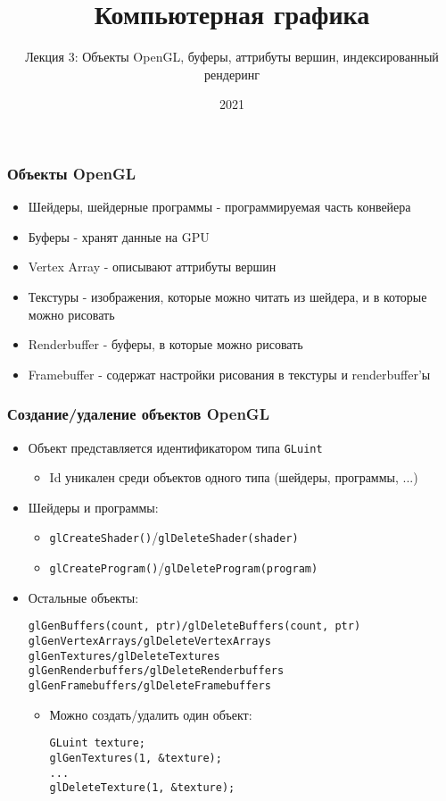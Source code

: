 \documentclass{beamer}
\title{Компьютерная графика}
\subtitle{Лекция 3: Объекты OpenGL, буферы, аттрибуты вершин, индексированный рендеринг}
\date{2021}
\begin{document}
\frame{\titlepage}

\begin{frame}[fragile]
\frametitle{Объекты OpenGL}
\begin{itemize}
\item Шейдеры, шейдерные программы - программируемая часть конвейера
\pause
\item Буферы - хранят данные на GPU
\pause
\item Vertex Array - описывают аттрибуты вершин
\pause
\item Текстуры - изображения, которые можно читать из шейдера, и в которые можно рисовать
\pause
\item Renderbuffer - буферы, в которые можно рисовать
\pause
\item Framebuffer - содержат настройки рисования в текстуры и renderbuffer'ы
\end{itemize}
\end{frame}

\begin{frame}[fragile]
\frametitle{Создание/удаление объектов OpenGL}
\begin{itemize}
\item Объект представляется идентификатором типа \verb|GLuint|
\begin{itemize}
\item Id уникален среди объектов одного типа (шейдеры, программы, ...)
\end{itemize}
\pause
\item Шейдеры и программы:
\begin{itemize}
\item \verb|glCreateShader()|/\verb|glDeleteShader(shader)|
\item \verb|glCreateProgram()|/\verb|glDeleteProgram(program)|
\end{itemize}
\pause
\item Остальные объекты:
\begin{verbatim}
glGenBuffers(count, ptr)/glDeleteBuffers(count, ptr)
glGenVertexArrays/glDeleteVertexArrays
glGenTextures/glDeleteTextures
glGenRenderbuffers/glDeleteRenderbuffers
glGenFramebuffers/glDeleteFramebuffers
\end{verbatim}
\pause
\begin{itemize}
\item Можно создать/удалить один объект:
\begin{verbatim}
GLuint texture;
glGenTextures(1, &texture);
...
glDeleteTexture(1, &texture);
\end{verbatim}
\end{itemize}
\end{itemize}
\end{frame}
\end{document}
